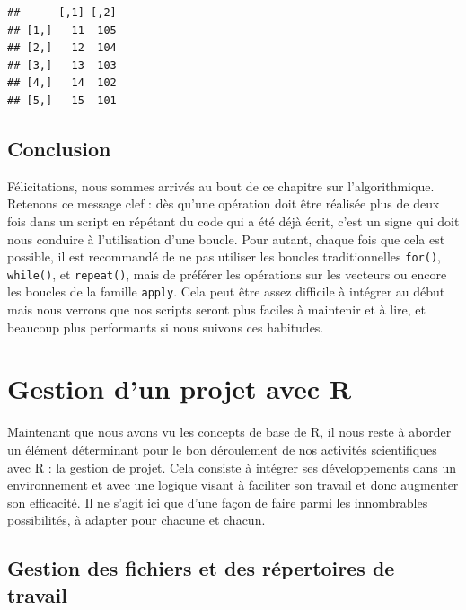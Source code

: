 \documentclass[twoside,symmetric]{book}
\begin{document}
\begin{verbatim}
##      [,1] [,2]
## [1,]   11  105
## [2,]   12  104
## [3,]   13  103
## [4,]   14  102
## [5,]   15  101
\end{verbatim}

\hypertarget{conclusion-6}{%
\section{Conclusion}\label{conclusion-6}}

Félicitations, nous sommes arrivés au bout de ce chapitre sur l'algorithmique. Retenons ce message clef : dès qu'une opération doit être réalisée plus de deux fois dans un script en répétant du code qui a été déjà écrit, c'est un signe qui doit nous conduire à l'utilisation d'une boucle. Pour autant, chaque fois que cela est possible, il est recommandé de ne pas utiliser les boucles traditionnelles \texttt{for()}, \texttt{while()}, et \texttt{repeat()}, mais de préférer les opérations sur les vecteurs ou encore les boucles de la famille \texttt{apply}. Cela peut être assez difficile à intégrer au début mais nous verrons que nos scripts seront plus faciles à maintenir et à lire, et beaucoup plus performants si nous suivons ces habitudes.

\hypertarget{project}{%
\chapter{Gestion d'un projet avec R}\label{project}}

\minitoc

Maintenant que nous avons vu les concepts de base de R, il nous reste à aborder un élément déterminant pour le bon déroulement de nos activités scientifiques avec R : la gestion de projet. Cela consiste à intégrer ses développements dans un environnement et avec une logique visant à faciliter son travail et donc augmenter son efficacité. Il ne s'agit ici que d'une façon de faire parmi les innombrables possibilités, à adapter pour chacune et chacun.

\hypertarget{gestion-des-fichiers-et-des-ruxe9pertoires-de-travail}{%
\section{Gestion des fichiers et des répertoires de travail}\label{gestion-des-fichiers-et-des-ruxe9pertoires-de-travail}}
\end{document}
